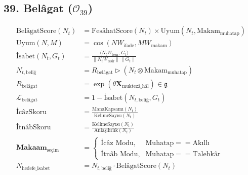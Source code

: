 \documentclass[11pt, a4paper]{article}
\begin{document}
\subsection{39. Belâgat ($\mathcal{O}_{39}$)}
\begin{align}
\text{BelâgatScore}(N_t) &= \text{FesâhatScore}(N_t) \times \text{Uyum}\left( N_t, \text{Makam}_{\text{muhatap}} \right) \\
\text{Uyum}(N, M) &= \cos(N W_{\text{ifade}}, M W_{\text{makam}}) \\
\text{İsabet}(N_t, G_t) &= \frac{\langle N_t W_{\text{tesir}}, G_t \rangle}{\|N_t W_{\text{tesir}}\| \|G_t\|} \\
N_{t, \text{beliğ}} &= R_{\text{belâgat}} \triangleright (N_t \otimes \text{Makam}_{\text{muhatap}}) \\
R_{\text{belâgat}} &= \exp\left( \theta \mathbf{X}_{\text{muktezâ\_hâl}} \right) \in \mathfrak{g} \\
\mathcal{L}_{\text{belâgat}} &= 1 - \text{İsabet}(N_{t, \text{beliğ}}, G_t) \\
\text{İcâzSkoru} &= \frac{\text{ManaKapsamı}(N_t)}{\text{KelimeSayısı}(N_t)} \\
\text{İtnâbSkoru} &= \frac{\text{KelimeSayısı}(N_t)}{\text{Anlaşılırlık}(N_t)} \\
\mathbf{Makaam}_{\text{seçim}} &= 
\begin{cases}
\text{İcâz Modu}, & \text{Muhatap} == \text{Akıllı} \\
\text{İtnâb Modu}, & \text{Muhatap} == \text{Talebkâr}
\end{cases} \\
N_{\text{hedefe\_isabet}} &= N_{t, \text{beliğ}} \cdot \text{BelâgatScore}(N_t)
\end{align}
\end{document}
